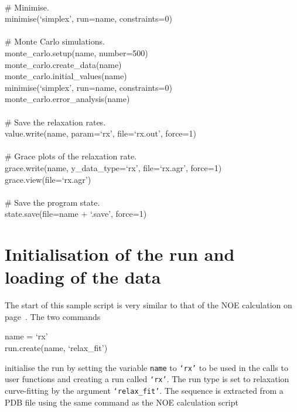 \begin{exampleenv}
 \\
\# Minimise. \\
minimise(`simplex', run=name, constraints=0) \\
 \\
\# Monte Carlo simulations. \\
monte\_carlo.setup(name, number=500) \\
monte\_carlo.create\_data(name) \\
monte\_carlo.initial\_values(name) \\
minimise(`simplex', run=name, constraints=0) \\
monte\_carlo.error\_analysis(name) \\
 \\
\# Save the relaxation rates. \\
value.write(name, param=`rx', file=`rx.out', force=1) \\
 \\
\# Grace plots of the relaxation rate. \\
grace.write(name, y\_data\_type=`rx', file=`rx.agr', force=1) \\
grace.view(file=`rx.agr') \\
 \\
\# Save the program state. \\
state.save(file=name + `.save', force=1)
\end{exampleenv}




\section{Initialisation of the run and loading of the data}

The start of this sample script is very similar to that of the NOE calculation on page~\pageref{NOE initialisation}.  The two commands

\begin{exampleenv}
name = `rx' \\
run.create(name, `relax\_fit')
\end{exampleenv}

initialise the run by setting the variable \texttt{name} to \texttt{`rx'} to be used in the calls to user functions and creating a run called \texttt{`rx'}.  The run type is set to relaxation curve-fitting by the argument \texttt{`relax\_fit'}.  The sequence is extracted from a PDB file using the same command as the NOE calculation script

